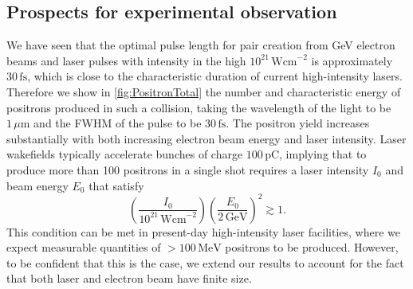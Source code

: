 \documentclass[reprint,superscriptaddress,amsmath,amssymb,aps,pra]{revtex4-1}
\newcommand{\micron}{{\mu\mathrm{m}}}
\newcommand{\Wcm}{\mathrm{Wcm}}
\newcommand{\fs}{\mathrm{fs}}
\newcommand{\MeV}{\mathrm{MeV}}
\begin{document}
\subsection{Prospects for experimental observation}
\label{ssec:Expt}

	\begin{figure*}
	\caption[Experimental parameters]
			{(left) $\log_{10}$-scaled yield (per electron)
			and (right) typical energy in MeV of positrons produced
			in the collision of an electron beam with energy $E_0$
			and a laser pulse with peak intensity $I_0$, wavelength $1\,\micron$
			and FWHM $30\,\fs$, as predicted by \cref{eq:PositronYieldE}.}
	\label{fig:PositronTotal}
	\end{figure*}

We have seen that the optimal pulse length for pair creation from
GeV electron beams and laser pulses with intensity in the high $10^{21}\,\Wcm^{-2}$
is approximately $30\,\fs$, which is close to the characteristic duration
of current high-intensity lasers. Therefore we show in \cref{fig:PositronTotal}
the number and characteristic energy of positrons produced in such a collision,
taking the wavelength of the light to be $1\,\micron$ and the FWHM of the pulse
to be $30\,\fs$.
The positron yield increases substantially with both increasing electron beam
energy and laser intensity. Laser wakefields typically accelerate bunches
of charge $100\,$pC, implying that to produce more than
100 positrons in a single shot requires a laser intensity $I_0$ and beam
energy $E_0$ that satisfy
	\begin{equation}
	\left(\frac{I_0}{10^{21}\,\Wcm^{-2}}\right)
	\left(\frac{E_0}{2\,\text{GeV}}\right)^2 \gtrsim 1.
	\label{eq:Condition}
	\end{equation}
This condition can be met in present-day high-intensity laser facilities,
where we expect measurable quantities of $>100\,\MeV$ positrons to be produced.
However, to be confident that this is the case, we extend our results
to account for the fact that both laser and electron beam
have finite size.
\end{document}
